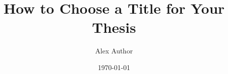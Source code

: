 
\title{How to Choose a Title for Your Thesis}
\author{Alex Author}
\newcommand{\supervisor}{Su Pervisor\\Dr.\ Co Supervisor}
\date{\today}  %

\newcommand{\university}{Ludwig-Maximilians-Universität München}
\newcommand{\institution}{Faculty of Mathematics, Informatics and Statistics\\
Department of Statistics
}

\newcommand{\thesisfield}{Statistics and Data Science}

\newcommand{\thesisdegree}{Master of Science (M.Sc.)}
